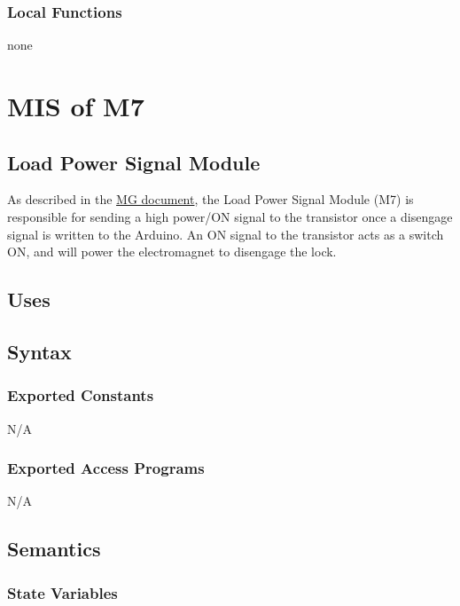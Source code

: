 \documentclass[12pt, titlepage]{article}
\begin{document}
\subsubsection{Local Functions}

none

\section{MIS of M7  \label{LoadPowerSignal}}

\subsection{Load Power Signal Module}

As described in the \href{https://github.com/NevoAbigail/Capstone/blob/main/docs/Design/SoftArchitecture/MG.pdf}{MG document}, the Load Power Signal Module (M7) is responsible for sending a high power/ON signal to the transistor once a disengage signal is written to the Arduino. An ON signal to the transistor acts as a switch ON, and will power the electromagnet to disengage the lock. 

\subsection{Uses}

\subsection{Syntax}

\subsubsection{Exported Constants}

N/A

\subsubsection{Exported Access Programs}

N/A

\subsection{Semantics}

\subsubsection{State Variables}
\end{document}
